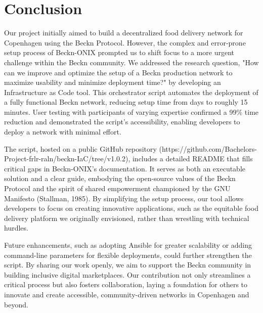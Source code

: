 \newpage
\section{Conclusion}
\label{conclusion}

Our project initially aimed to build a decentralized food delivery network for Copenhagen using the Beckn Protocol. However, the complex and error-prone setup process of Beckn-ONIX prompted us to shift focus to a more urgent challenge within the Beckn community. We addressed the research question, "How can we improve and optimize the setup of a Beckn production network to maximize usability and minimize deployment time?" by developing an Infrastructure as Code tool. This orchestrator script automates the deployment of a fully functional Beckn network, reducing setup time from days to roughly 15 minutes. User testing with participants of varying expertise confirmed a 99\% time reduction and demonstrated the script’s accessibility, enabling developers to deploy a network with minimal effort.

The script, hosted on a public GitHub repository (https://github.com/Bachelors-Project-frlr-raln/beckn-IaC/tree/v1.0.2), includes a detailed README that fills critical gaps in Beckn-ONIX’s documentation. It serves as both an executable solution and a clear guide, embodying the open-source values of the Beckn Protocol and the spirit of shared empowerment championed by the GNU Manifesto (Stallman, 1985). By simplifying the setup process, our tool allows developers to focus on creating innovative applications, such as the equitable food delivery platform we originally envisioned, rather than wrestling with technical hurdles.

Future enhancements, such as adopting Ansible for greater scalability or adding command-line parameters for flexible deployments, could further strengthen the script. By sharing our work openly, we aim to support the Beckn community in building inclusive digital marketplaces. Our contribution not only streamlines a critical process but also fosters collaboration, laying a foundation for others to innovate and create accessible, community-driven networks in Copenhagen and beyond.
